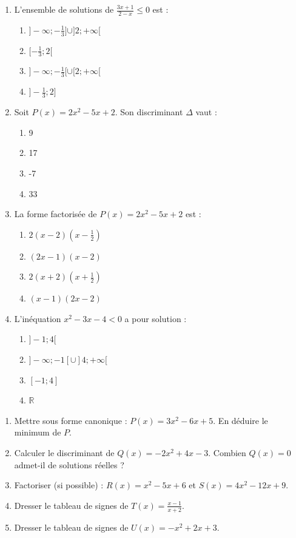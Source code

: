 \documentclass[11pt]{article}
\begin{document}
\begin{exercice}
\begin{enumerate}
    \item L'ensemble de solutions de $\frac{3x+1}{2-x} \leq 0$ est :
    \begin{enumerate}
        \item $]-\infty; -\frac{1}{3}] \cup ]2; +\infty[$
        \item $[-\frac{1}{3}; 2[$
        \item $]-\infty; -\frac{1}{3}[ \cup [2; +\infty[$
        \item $]-\frac{1}{3}; 2]$
    \end{enumerate}
    \item Soit $P(x)=2x^2-5x+2$. Son discriminant $\Delta$ vaut :
    \begin{enumerate}
        \item 9
        \item 17
        \item -7
        \item 33
    \end{enumerate}
    \item La forme factorisée de $P(x)=2x^2-5x+2$ est :
    \begin{enumerate}
        \item $2(x-2)(x-\frac{1}{2})$
        \item $(2x-1)(x-2)$
        \item $2(x+2)(x+\frac{1}{2})$
        \item $(x-1)(2x-2)$
    \end{enumerate}
    \item L'inéquation $x^2 - 3x - 4 < 0$ a pour solution :
    \begin{enumerate}
        \item $]-1; 4[$
        \item $]-\infty; -1[ \cup ]4; +\infty[$
        \item $[-1; 4]$
        \item $\mathbb{R}$
    \end{enumerate}
\end{enumerate}
\end{exercice}

\begin{exercice}
\begin{enumerate}
    \item Mettre sous forme canonique : $P(x)=3x^2-6x+5$. En déduire le minimum de $P$.
    \item Calculer le discriminant de $Q(x)=-2x^2+4x-3$. Combien $Q(x)=0$ admet-il de solutions réelles ?
    \item Factoriser (si possible) : $R(x)=x^2-5x+6$ et $S(x)=4x^2-12x+9$.
    \item Dresser le tableau de signes de $T(x)=\frac{x-1}{x+2}$.
    \item Dresser le tableau de signes de $U(x)=-x^2+2x+3$.
\end{enumerate}
\end{exercice}
\end{document}
